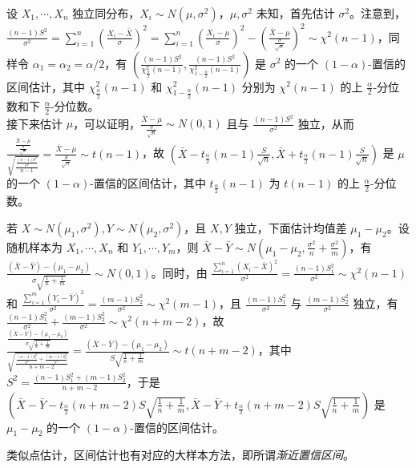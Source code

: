 \documentclass[../main.tex]{subfiles}
\begin{document}
\begin{example}
    设 $X_1,\cdots,X_n$ 独立同分布，$X_i\sim N(\mu,\sigma^2)$，$\mu,\sigma^2$ 未知，首先估计 $\sigma^2$。注意到，$\frac{(n-1)S^2}{\sigma^2}=\sum_{i=1}^n\left(\frac{X_i-\bar X}{\sigma}\right)^2=\sum_{i=1}^n\left(\frac{X_i-\mu}{\sigma}\right)^2-\left(\frac{\bar X-\mu}{\frac\sigma{\sqrt{n}}}\right)^2\sim\chi^2(n-1)$，同样令 $\alpha_1=\alpha_2=\alpha/2$，有 $(\frac{(n-1)S^2}{\chi^2_{\frac\alpha2}(n-1)},\frac{(n-1)S^2}{\chi^2_{1-\frac\alpha2}(n-1)})$ 是 $\sigma^2$ 的一个 $(1-\alpha)$-置信的区间估计，其中 $\chi^2_{\frac\alpha2}(n-1)$ 和 $\chi^2_{1-\frac\alpha2}(n-1)$ 分别为 $\chi^2(n-1)$ 的上 $\frac\alpha2$-分位数和下 $\frac\alpha2$-分位数。\\
    接下来估计 $\mu$，可以证明，$\frac{\bar X-\mu}{\frac\sigma{\sqrt{n}}}\sim N(0,1)$ 且与 $\frac{(n-1)S^2}{\sigma^2}$ 独立，从而 $\frac{\frac{\bar X-\mu}{\frac\sigma{\sqrt{n}}}}{\sqrt{\frac{\frac{(n-1)S^2}{\sigma^2}}{n-1}}}=\frac{\bar X-\mu}{\frac S{\sqrt{n}}}\sim t(n-1)$，故 $(\bar X-t_{\frac\alpha2}(n-1)\frac S{\sqrt{n}},\bar X+t_{\frac\alpha2}(n-1)\frac S{\sqrt{n}})$ 是 $\mu$ 的一个 $(1-\alpha)$-置信的区间估计，其中 $t_{\frac\alpha2}(n-1)$ 为 $t(n-1)$ 的上 $\frac\alpha2$-分位数。
\end{example}

\begin{example}
    若 $X\sim N(\mu_1,\sigma^2),Y\sim N(\mu_2,\sigma^2)$，且 $X,Y$ 独立，下面估计均值差 $\mu_1-\mu_2$。设随机样本为 $X_1,\cdots,X_n$ 和 $Y_1,\cdots,Y_m$，则 $\bar X-\bar Y\sim N(\mu_1-\mu_2,\frac{\sigma^2}n+\frac{\sigma^2}m)$，有 $\frac{(\bar X-\bar Y)-(\mu_1-\mu_2)}{\sigma\sqrt{\frac1n+\frac1m}}\sim N(0,1)$。同时，由 $\frac{\sum_{i=1}^n(X_i-\bar X)^2}{\sigma^2}=\frac{(n-1)S_1^2}{\sigma^2}\sim\chi^2(n-1)$ 和 $\frac{\sum_{i=1}^m(Y_i-\bar Y)^2}{\sigma^2}= \frac{(m-1)S_2^2}{\sigma^2}\sim\chi^2(m-1)$，且 $\frac{(n-1)S_1^2}{\sigma^2}$ 与 $\frac{(m-1)S_2^2}{\sigma^2}$ 独立，有 $\frac{(n-1)S_1^2}{\sigma^2}+\frac{(m-1)S_2^2}{\sigma^2}\sim\chi^2(n+m-2)$，故 $\frac{\frac{(\bar X-\bar Y)-(\mu_1-\mu_2)}{\sigma\sqrt{\frac1n+\frac1m}}}{\sqrt{\frac{\frac{(n-1)S_1^2}{\sigma^2}+\frac{(m-1)S_2^2}{\sigma^2}}{n+m-2}}}=\frac{(\bar X-\bar Y)-(\mu_1-\mu_2)}{S\sqrt{\frac1n+\frac1m}}\sim t(n+m-2)$，其中 $S^2=\frac{(n-1)S_1^2+(m-1)S_2^2}{n+m-2}$，于是 $(\bar X-\bar Y-t_{\frac\alpha2}(n+m-2)S\sqrt{\frac1n+\frac1m},\bar X-\bar Y+t_{\frac\alpha2}(n+m-2)S\sqrt{\frac1n+\frac1m})$ 是 $\mu_1-\mu_2$ 的一个 $(1-\alpha)$-置信的区间估计。
\end{example}

类似点估计，区间估计也有对应的大样本方法，即所谓\emph{渐近置信区间}。
\end{document}
